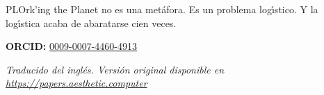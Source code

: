 \documentclass[10pt,letterpaper,twocolumn]{article}
\begin{document}
PLOrk'ing the Planet no es una met\'{a}fora. Es un problema log\'{\i}stico. Y la log\'{\i}stica acaba de abaratarse cien veces.

\vspace{0.5em}
\noindent\textbf{ORCID:} \href{https://orcid.org/0009-0007-4460-4913}{0009-0007-4460-4913}

\vspace{0.5em}
\noindent\textit{Traducido del ingl\'{e}s. Versi\'{o}n original disponible en \url{https://papers.aesthetic.computer}}




\end{document}
